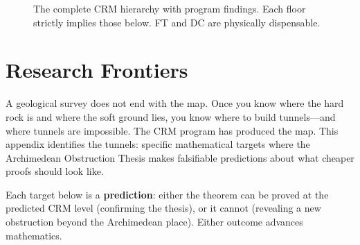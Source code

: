\documentclass[11pt,twoside,openany]{report}
\theoremstyle{remark}
\newcommand{\BISH}{\textsf{BISH}}
\newcommand{\WKL}{\textsf{WKL}}
\newcommand{\CLASS}{\textsf{CLASS}}
\begin{document}
\begin{figure}[htbp]
{%
}%
\caption{The complete CRM hierarchy with program findings. Each floor strictly implies those below. FT and DC are physically dispensable.}
\label{fig:full-hierarchy}
\end{figure}


\chapter{Research Frontiers}\label{app:frontiers}

\begin{analogybox}
A geological survey does not end with the map. Once you know where the hard rock is and where the soft ground lies, you know where to build tunnels---and where tunnels are impossible. The CRM program has produced the map. This appendix identifies the tunnels: specific mathematical targets where the Archimedean Obstruction Thesis makes falsifiable predictions about what cheaper proofs should look like.

Each target below is a \textbf{prediction}: either the theorem can be proved at the predicted CRM level (confirming the thesis), or it cannot (revealing a new obstruction beyond the Archimedean place). Either outcome advances mathematics.
\end{analogybox}
\end{document}
